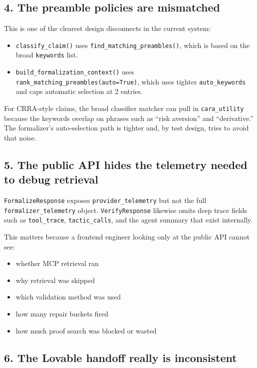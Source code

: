 \documentclass[11pt]{article}
\begin{document}
\subsection*{4. The preamble policies are mismatched}

This is one of the clearest design disconnects in the current system:

\begin{itemize}[leftmargin=1.5em]
  \item \texttt{classify\_claim()} uses \texttt{find\_matching\_preambles()},
  which is based on the broad \texttt{keywords} list.
  \item \texttt{build\_formalization\_context()} uses
  \texttt{rank\_matching\_preambles(auto=True)}, which uses tighter
  \texttt{auto\_keywords} and caps automatic selection at 2 entries.
\end{itemize}

For CRRA-style claims, the broad classifier matcher can pull in
\texttt{cara\_utility} because the keywords overlap on phrases such as
``risk aversion'' and ``derivative.'' The formalizer's auto-selection path is
tighter and, by test design, tries to avoid that noise.

\subsection*{5. The public API hides the telemetry needed to debug retrieval}

\texttt{FormalizeResponse} exposes \texttt{provider\_telemetry} but not the
full \texttt{formalizer\_telemetry} object. \texttt{VerifyResponse} likewise
omits deep trace fields such as \texttt{tool\_trace}, \texttt{tactic\_calls},
and the agent summary that exist internally.

This matters because a frontend engineer looking only at the public API cannot
see:

\begin{itemize}[leftmargin=1.5em]
  \item whether MCP retrieval ran
  \item why retrieval was skipped
  \item which validation method was used
  \item how many repair buckets fired
  \item how much proof search was blocked or wasted
\end{itemize}

\subsection*{6. The Lovable handoff really is inconsistent}
\end{document}
